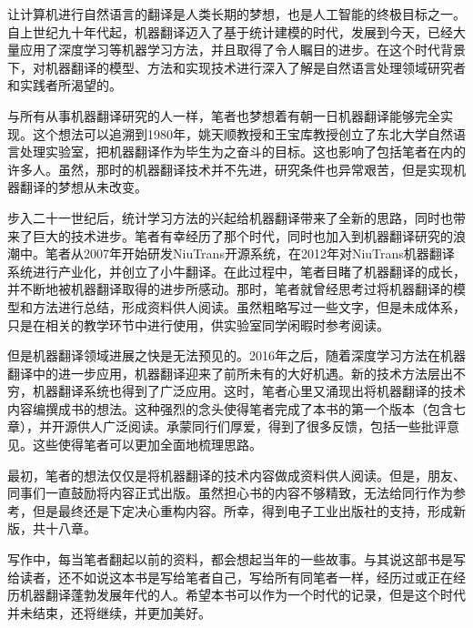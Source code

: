 \begin{spacing}{1.18}


\vspace{0.5em}

让计算机进行自然语言的翻译是人类长期的梦想，也是人工智能的终极目标之一。自上世纪九十年代起，机器翻译迈入了基于统计建模的时代，发展到今天，已经大量应用了深度学习等机器学习方法，并且取得了令人瞩目的进步。在这个时代背景下，对机器翻译的模型、方法和实现技术进行深入了解是自然语言处理领域研究者和实践者所渴望的。

与所有从事机器翻译研究的人一样，笔者也梦想着有朝一日机器翻译能够完全实现。这个想法可以追溯到1980年，姚天顺教授和王宝库教授创立了东北大学自然语言处理实验室，把机器翻译作为毕生为之奋斗的目标。这也影响了包括笔者在内的许多人。虽然，那时的机器翻译技术并不先进，研究条件也异常艰苦，但是实现机器翻译的梦想从未改变。

步入二十一世纪后，统计学习方法的兴起给机器翻译带来了全新的思路，同时也带来了巨大的技术进步。笔者有幸经历了那个时代，同时也加入到机器翻译研究的浪潮中。笔者从2007年开始研发NiuTrans开源系统，在2012年对NiuTrans机器翻译系统进行产业化，并创立了小牛翻译。在此过程中，笔者目睹了机器翻译的成长，并不断地被机器翻译取得的进步所感动。那时，笔者就曾经思考过将机器翻译的模型和方法进行总结，形成资料供人阅读。虽然粗略写过一些文字，但是未成体系，只是在相关的教学环节中进行使用，供实验室同学闲暇时参考阅读。

但是机器翻译领域进展之快是无法预见的。2016年之后，随着深度学习方法在机器翻译中的进一步应用，机器翻译迎来了前所未有的大好机遇。新的技术方法层出不穷，机器翻译系统也得到了广泛应用。这时，笔者心里又涌现出将机器翻译的技术内容编撰成书的想法。这种强烈的念头使得笔者完成了本书的第一个版本（包含七章），并开源供人广泛阅读。承蒙同行们厚爱，得到了很多反馈，包括一些批评意见。这些使得笔者可以更加全面地梳理思路。

最初，笔者的想法仅仅是将机器翻译的技术内容做成资料供人阅读。但是，朋友、同事们一直鼓励将内容正式出版。虽然担心书的内容不够精致，无法给同行作为参考，但是最终还是下定决心重构内容。所幸，得到电子工业出版社的支持，形成新版，共十八章。

写作中，每当笔者翻起以前的资料，都会想起当年的一些故事。与其说这部书是写给读者，还不如说这本书是写给笔者自己，写给所有同笔者一样，经历过或正在经历机器翻译蓬勃发展年代的人。希望本书可以作为一个时代的记录，但是这个时代并未结束，还将继续，并更加美好。

\vspace{1.0em}


\end{spacing}
